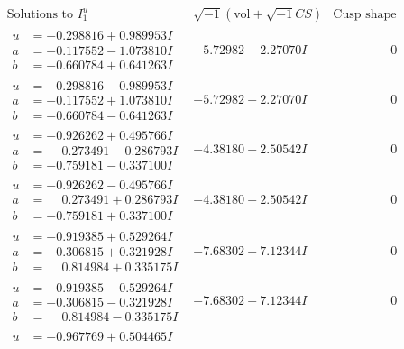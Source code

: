 \documentclass[1p]{elsarticle_modified}
\theoremstyle{definition}
\newcommand{\I}{\sqrt{-1}}
\begin{document}
$$\begin{array}{c|c|c}  
\text{Solutions to }I^u_{1}& \I (\text{vol} + \sqrt{-1}CS) & \text{Cusp shape}\\
 \hline 
\begin{aligned}
u &= -0.298816 + 0.989953 I \\
a &= -0.117552 - 1.073810 I \\
b &= -0.660784 + 0.641263 I\end{aligned}
 & -5.72982 - 2.27070 I & \phantom{-0.000000 } 0 \\ \hline\begin{aligned}
u &= -0.298816 - 0.989953 I \\
a &= -0.117552 + 1.073810 I \\
b &= -0.660784 - 0.641263 I\end{aligned}
 & -5.72982 + 2.27070 I & \phantom{-0.000000 } 0 \\ \hline\begin{aligned}
u &= -0.926262 + 0.495766 I \\
a &= \phantom{-}0.273491 - 0.286793 I \\
b &= -0.759181 - 0.337100 I\end{aligned}
 & -4.38180 + 2.50542 I & \phantom{-0.000000 } 0 \\ \hline\begin{aligned}
u &= -0.926262 - 0.495766 I \\
a &= \phantom{-}0.273491 + 0.286793 I \\
b &= -0.759181 + 0.337100 I\end{aligned}
 & -4.38180 - 2.50542 I & \phantom{-0.000000 } 0 \\ \hline\begin{aligned}
u &= -0.919385 + 0.529264 I \\
a &= -0.306815 + 0.321928 I \\
b &= \phantom{-}0.814984 + 0.335175 I\end{aligned}
 & -7.68302 + 7.12344 I & \phantom{-0.000000 } 0 \\ \hline\begin{aligned}
u &= -0.919385 - 0.529264 I \\
a &= -0.306815 - 0.321928 I \\
b &= \phantom{-}0.814984 - 0.335175 I\end{aligned}
 & -7.68302 - 7.12344 I & \phantom{-0.000000 } 0 \\ \hline\begin{aligned}
u &= -0.967769 + 0.504465 I \\

\end{aligned}
\end{array}$$
\end{document}
